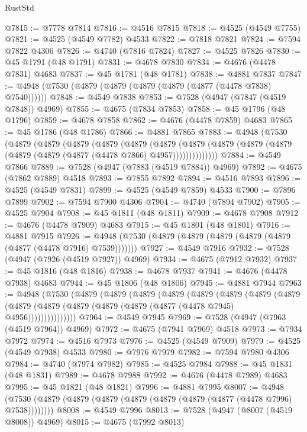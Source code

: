 \begin{lexlean}{RustStd}
\begin{coremodule}
{\begin{coremodule}
{{{{{{{{{{{{{{{{{{{{{{{{{{{{{{{{{{{{{{{{{{{{{{{{{{{{{{{{{{{{@7815 := @7778 @7814
@7816 := @4516 @7815
@7818 := @4525 (@4549 @7755)
@7821 := @4525 (@4549 @7782) @4533
@7822 := @7818 @7821
@7824 := @7594 @7822 @4306
@7826 := @4740 (@7816 @7824)
@7827 := @4525 @7826
@7830 := @45 @1791 (@48 @1791)
@7831 := @4678 @7830
@7834 := @4676 (@4478 @7831) @4683
@7837 := @45 @1781 (@48 @1781)
@7838 := @4881 @7837
@7847 := @4948 (@7530 (@4879 (@4879 (@4879 (@4879 (@4877 (@4478 @7838) @7540))))))
@7848 := @4549 @7838
@7853 := @7528 (@4947 (@7847 (@4519 @7848)) @4969)
@7855 := @4675 (@7834 @7853)
@7858 := @45 @1796 (@48 @1796)
@7859 := @4678 @7858
@7862 := @4676 (@4478 @7859) @4683
@7865 := @45 @1786 (@48 @1786)
@7866 := @4881 @7865
@7883 := @4948
    (@7530
      (@4879
        (@4879
          (@4879
            (@4879
              (@4879
                (@4879
                  (@4879 (@4879 (@4879 (@4879 (@4879 (@4879 (@4877 (@4478 @7866) @4957))))))))))))))
@7884 := @4549 @7866
@7889 := @7528 (@4947 (@7883 (@4519 @7884)) @4969)
@7892 := @4675 (@7862 @7889) @4518
@7893 := @7855 @7892
@7894 := @4516 @7893
@7896 := @4525 (@4549 @7831)
@7899 := @4525 (@4549 @7859) @4533
@7900 := @7896 @7899
@7902 := @7594 @7900 @4306
@7904 := @4740 (@7894 @7902)
@7905 := @4525 @7904
@7908 := @45 @1811 (@48 @1811)
@7909 := @4678 @7908
@7912 := @4676 (@4478 @7909) @4683
@7915 := @45 @1801 (@48 @1801)
@7916 := @4881 @7915
@7926 := @4948 (@7530 (@4879 (@4879 (@4879 (@4879 (@4879 (@4877 (@4478 @7916) @7539)))))))
@7927 := @4549 @7916
@7932 := @7528 (@4947 (@7926 (@4519 @7927)) @4969)
@7934 := @4675 (@7912 @7932)
@7937 := @45 @1816 (@48 @1816)
@7938 := @4678 @7937
@7941 := @4676 (@4478 @7938) @4683
@7944 := @45 @1806 (@48 @1806)
@7945 := @4881 @7944
@7963 := @4948
    (@7530
      (@4879
        (@4879
          (@4879
            (@4879
              (@4879
                (@4879
                  (@4879
                    (@4879
                      (@4879 (@4879 (@4879 (@4879 (@4879 (@4877 (@4478 @7945) @4956)))))))))))))))
@7964 := @4549 @7945
@7969 := @7528 (@4947 (@7963 (@4519 @7964)) @4969)
@7972 := @4675 (@7941 @7969) @4518
@7973 := @7934 @7972
@7974 := @4516 @7973
@7976 := @4525 (@4549 @7909)
@7979 := @4525 (@4549 @7938) @4533
@7980 := @7976 @7979
@7982 := @7594 @7980 @4306
@7984 := @4740 (@7974 @7982)
@7985 := @4525 @7984
@7988 := @45 @1831 (@48 @1831)
@7989 := @4678 @7988
@7992 := @4676 (@4478 @7989) @4683
@7995 := @45 @1821 (@48 @1821)
@7996 := @4881 @7995
@8007 := @4948 (@7530 (@4879 (@4879 (@4879 (@4879 (@4879 (@4879 (@4877 (@4478 @7996) @7538))))))))
@8008 := @4549 @7996
@8013 := @7528 (@4947 (@8007 (@4519 @8008)) @4969)
@8015 := @4675 (@7992 @8013)
}}}}}}}}}}}}}}}}}}}}}}}}}}}}}}}}}}}}}}}}}}}}}}}}}}}}}}}}}}}}
\end{coremodule}}
\end{coremodule}
\end{lexlean}
